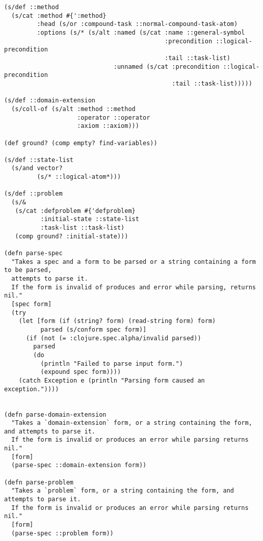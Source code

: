 \begin{lstlisting}
(s/def ::method
  (s/cat :method #{':method}
         :head (s/or :compound-task ::normal-compound-task-atom)
         :options (s/* (s/alt :named (s/cat :name ::general-symbol
                                            :precondition ::logical-precondition
                                            :tail ::task-list)
                              :unnamed (s/cat :precondition ::logical-precondition
                                              :tail ::task-list)))))

(s/def ::domain-extension
  (s/coll-of (s/alt :method ::method
                    :operator ::operator
                    :axiom ::axiom)))

(def ground? (comp empty? find-variables))

(s/def ::state-list
  (s/and vector?
         (s/* ::logical-atom*)))

(s/def ::problem
  (s/&
   (s/cat :defproblem #{'defproblem}
          :initial-state ::state-list
          :task-list ::task-list)
   (comp ground? :initial-state)))

(defn parse-spec
  "Takes a spec and a form to be parsed or a string containing a form to be parsed,
  attempts to parse it.
  If the form is invalid of produces and error while parsing, returns nil."
  [spec form]
  (try
    (let [form (if (string? form) (read-string form) form)
          parsed (s/conform spec form)]
      (if (not (= :clojure.spec.alpha/invalid parsed))
        parsed
        (do
          (println "Failed to parse input form.")
          (expound spec form))))
    (catch Exception e (println "Parsing form caused an exception."))))


(defn parse-domain-extension
  "Takes a `domain-extension` form, or a string containing the form, and attempts to parse it.
  If the form is invalid or produces an error while parsing returns nil."
  [form]
  (parse-spec ::domain-extension form))

(defn parse-problem
  "Takes a `problem` form, or a string containing the form, and attempts to parse it.
  If the form is invalid or produces an error while parsing returns nil."
  [form]
  (parse-spec ::problem form))
\end{lstlisting}

